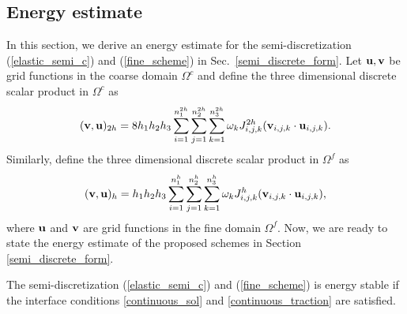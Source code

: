 \subsection{Energy estimate}\label{sec_energy}
In this section, we derive an energy estimate for the semi-discretization (\ref{elastic_semi_c}) and (\ref{fine_scheme}) in Sec.~\ref{semi_discrete_form}. Let ${\bf u}, {\bf v}$ be grid functions in the coarse domain $\Omega^c$ and define the three dimensional discrete scalar product in $\Omega^c$ as
\begin{equation}\label{scalar_product_inner}
({\bf v}, {\bf u})_{2h} = 8h_1h_2h_3\sum_{i=1}^{n_1^{2h}}\sum_{j=1}^{n_2^{2h}}\sum_{k=1}^{n_3^{2h}}\omega_k{J}^{2h}_{i,j,k}({\bf v}_{i,j,k}\cdot {\bf u}_{i,j,k}).
\end{equation}
 Similarly, define the three dimensional discrete scalar product in $\Omega^f$ as
\begin{equation}\label{scalar_product_inner_f}
({\bf v}, {\bf u})_{h} = h_1h_2h_3\sum_{i=1}^{n_1^{h}}\sum_{j=1}^{n_2^{h}}\sum_{k=1}^{n_3^{h}}\omega_k{J}^{h}_{i,j,k}({\bf v}_{i,j,k}\cdot {\bf u}_{i,j,k}),
\end{equation}
where $\bf u$ and $\bf v$ are grid functions in the fine domain $\Omega^f$. Now, we are ready to state the energy estimate of the proposed schemes in Section \ref{semi_discrete_form}. 
\begin{theorem}\label{thm1}
	The semi-discretization (\ref{elastic_semi_c}) and (\ref{fine_scheme}) is energy stable if the interface conditions \eqref{continuous_sol} and \eqref{continuous_traction} are satisfied.
\end{theorem}

